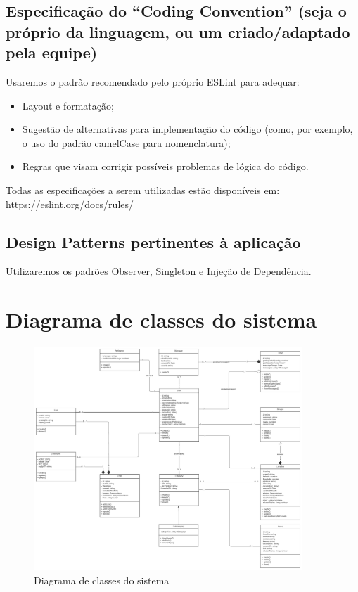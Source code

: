\section{Especificação do “Coding Convention” (seja o próprio da linguagem, ou um criado/adaptado pela equipe)}
Usaremos o padrão recomendado pelo próprio ESLint para adequar:
\begin{itemize}
    \item Layout e formatação;
    \item Sugestão de alternativas para implementação do código (como, por exemplo, o uso do padrão camelCase para nomenclatura);
    \item Regras que visam corrigir possíveis problemas de lógica do código.
\end{itemize}
Todas as especificações a serem utilizadas estão disponíveis em: https://eslint.org/docs/rules/

\section{Design Patterns pertinentes à aplicação}
Utilizaremos os padrões Observer, Singleton e Injeção de Dependência.

\chapter{Diagrama de classes do sistema}
\begin{figure}

    \centering
	\caption{\label{fig_diag_virado}Diagrama de classes do sistema}
	\includegraphics[width=0.9\textwidth]{anexos/diagrama.png}

	\end{figure}




